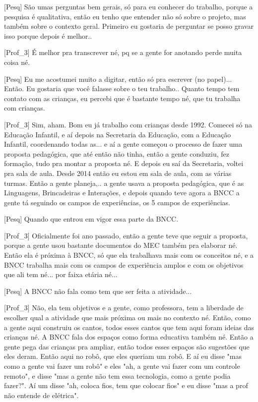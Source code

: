 [Pesq] São umas perguntas bem gerais, só para eu conhecer do trabalho, porque a pesquisa é qualitativa, então eu tenho que entender não só sobre o projeto, mas também sobre o contexto geral. Primeiro eu gostaria de perguntar se posso gravar isso porque depois é melhor..

[Prof\_3] É melhor pra transcrever né, pq se a gente for anotando perde muita coisa né.

[Pesq] Eu me acostumei muito a digitar, então só pra escrever (no papel)... Então. Eu gostaria que você falasse sobre o teu trabalho.. Quanto tempo tem contato com as crianças, eu percebi que é bastante tempo né, que tu trabalha com crianças.

[Prof\_3] Sim, aham. Bom eu já trabalho com crianças desde 1992. Comecei só na Educação Infantil, e aí depois na Secretaria da Educação, com a Educação Infantil, coordenando todas as... e aí a gente começou o processo de fazer uma proposta pedagógica, que até então não tinha, então a gente conduziu, fez formação, tudo pra montar a proposta né. E depois eu saí da Secretaria, voltei pra sala de aula. Desde 2014 então eu estou em sala de aula, com as várias turmas. Então a gente planeja,.. a gente usava a proposta pedagógica, que é as Linguagens, Brincadeiras e Interações, e depois quando teve agora a BNCC a gente tá seguindo os campos de experiências, os 5 campos de experiências.

[Pesq] Quando que entrou em vigor essa parte da BNCC.

[Prof\_3] Oficialmente foi ano passado, então a gente teve que seguir a proposta, porque a gente usou bastante documentos do MEC também pra elaborar né. Então ela é próxima à BNCC, só que ela trabalhava mais com os conceitos né, e a BNCC trabalha mais com os campos de experiência amplos e com os objetivos que ali tem né... por faixa etária né...

[Pesq] A BNCC não fala como tem que ser feita a atividade...

[Prof\_3] Não, ela tem objetivos e a gente, como professora, tem a liberdade de escolher qual a atividade que mais próxima ou mais no contexto né. Então, como a gente aqui construiu os cantos, todos esses cantos que tem aqui foram ideias das crianças né. A BNCC fala dos espaços como forma educativa também né. Então a gente pega das crianças pra ampliar, então todos esses espaços são sugestões que eles deram. Então aqui no robô, que eles queriam um robô. E aí eu disse "mas como a gente vai fazer um robô" e eles "ah, a gente vai fazer com um controle remoto", e disse "mas a gente não tem essa tecnologia, como a gente podia fazer?". Aí um disse "ah, coloca fios, tem que colocar fios" e eu disse "mas a prof não entende de elétrica".

